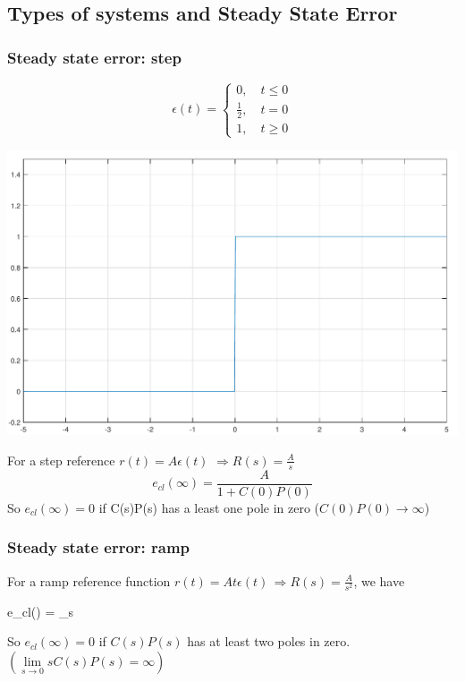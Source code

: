 \subsection[Types of systems and SS-error]{Types of systems and Steady State Error}

\begin{frame}
	\frametitle{Steady state error: step}
	\begin{definition}
		\begin{minipage}{0.4\linewidth}
			\[
			\epsilon (t) =
			\begin{cases}
			0, \quad t \leqslant 0 \\
			\frac{1}{2}, \quad t = 0 \\
			1, \quad t \geqslant 0
			\end{cases}
			\]
		\end{minipage}
		\begin{minipage}{0.5\linewidth}
			\hspace*{4em}
			\includegraphics[width=0.6\linewidth]{stepfunc}
		\end{minipage}
	\end{definition}
	\begin{block}{}
		For a step reference $r(t) = A \epsilon (t)$ $\Rightarrow R(s) = \frac{A}{s}$
		\[e_{cl}(\infty) = \frac{A}{1+C(0)P(0)} \]
		So $e_{cl}(\infty) = 0$ if C(s)P(s) has a least one pole in zero ($C(0)P(0) \rightarrow \infty$)
	\end{block}
\end{frame}

\begin{frame}
	\frametitle{Steady state error: ramp}
	\begin{block}{}
		For a ramp reference function $r(t) = At \epsilon (t) \, \Rightarrow R(s) = \frac{A}{s^2}$, we have
		\begin{flalign*}
			e_{cl}(\infty) = \lim\limits_{s }  
		\end{flalign*}
		So $e_{cl}(\infty) = 0$ if $C(s)P(s)$ has at least two poles in zero. $\left(\lim\limits_{s\rightarrow 0} sC(s)P(s) = \infty\right)$
	\end{block}
\end{frame}

